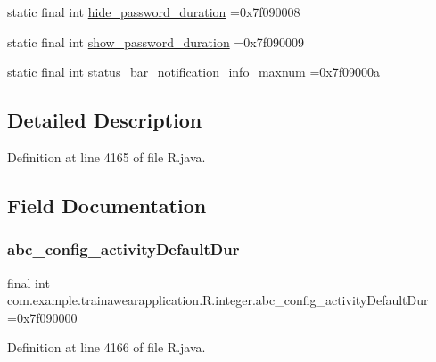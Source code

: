 \begin{DoxyCompactItemize}
\item 
static final int \mbox{\hyperlink{classcom_1_1example_1_1trainawearapplication_1_1_r_1_1integer_af19d9b54af7d930d8f478baf507e204a}{hide\+\_\+password\+\_\+duration}} =0x7f090008
\item 
static final int \mbox{\hyperlink{classcom_1_1example_1_1trainawearapplication_1_1_r_1_1integer_a8b8d4e7c1ea962ec309ce7de5a22f7d3}{show\+\_\+password\+\_\+duration}} =0x7f090009
\item 
static final int \mbox{\hyperlink{classcom_1_1example_1_1trainawearapplication_1_1_r_1_1integer_a4b9201aa0cdb2d6fc17f3d7d13229650}{status\+\_\+bar\+\_\+notification\+\_\+info\+\_\+maxnum}} =0x7f09000a
\end{DoxyCompactItemize}


\subsection{Detailed Description}


Definition at line 4165 of file R.\+java.



\subsection{Field Documentation}
\mbox{\label{classcom_1_1example_1_1trainawearapplication_1_1_r_1_1integer_abdf85258af27317fb88ff2a9f0e3d9ce}} 
\subsubsection{\texorpdfstring{abc\_config\_activityDefaultDur}{abc\_config\_activityDefaultDur}}
{\footnotesize\ttfamily final int com.\+example.\+trainawearapplication.\+R.\+integer.\+abc\+\_\+config\+\_\+activity\+Default\+Dur =0x7f090000\hspace{0.3cm}{\ttfamily [static]}}



Definition at line 4166 of file R.\+java.

\mbox{\label{classcom_1_1example_1_1trainawearapplication_1_1_r_1_1integer_a305e6a28be62e9a6de7c17239aedc1ce}} 
